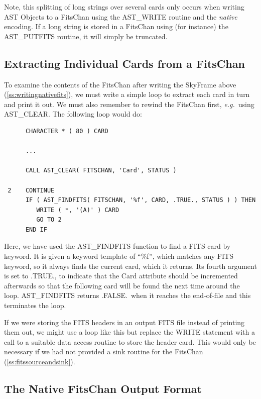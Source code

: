 \documentclass[twoside,11pt]{article}
\newcommand{\htmlref}[2]{#1}
\newcommand{\secref}[1]{\S\ref{#1}}
\renewcommand{\secref}[1]{\ref{#1}}
\begin{document}
Note, this splitting of long strings over several cards only occurs when
writing AST Objects to a FitsChan using the AST\_WRITE routine and the
{\em native} encoding. If a long string is stored in a FitsChan using
(for instance) the \htmlref{AST\_PUTFITS}{AST_PUTFITS} routine, it will simply be truncated.

\subsection{\label{ss:extractingfitscards}Extracting Individual Cards from a FitsChan}

To examine the contents of the \htmlref{FitsChan}{FitsChan} after writing the \htmlref{SkyFrame}{SkyFrame}
above (\secref{ss:writingnativefits}), we must write a simple loop to
extract each card in turn and print it out. We must also remember to
rewind the FitsChan first, {\em{e.g.}}\ using \htmlref{AST\_CLEAR}{AST_CLEAR}. The
following loop would do:

\small
\begin{verbatim}
      CHARACTER * ( 80 ) CARD

      ...

      CALL AST_CLEAR( FITSCHAN, 'Card', STATUS )

 2    CONTINUE
      IF ( AST_FINDFITS( FITSCHAN, '%f', CARD, .TRUE., STATUS ) ) THEN
         WRITE ( *, '(A)' ) CARD
         GO TO 2
      END IF
\end{verbatim}
\normalsize

Here, we have used the \htmlref{AST\_FINDFITS}{AST_FINDFITS} function to find a FITS card by
keyword. It is given a keyword template of ``\%f'', which matches any
FITS keyword, so it always finds the current card, which it
returns. Its fourth argument is set to .TRUE., to indicate that the
\htmlref{Card}{Card} attribute should be incremented afterwards so that the following
card will be found the next time around the loop. AST\_FINDFITS
returns .FALSE.\ when it reaches the end-of-file and this terminates
the loop.

If we were storing the FITS headers in an output FITS file instead of
printing them out, we might use a loop like this but replace the WRITE
statement with a call to a suitable data access routine to store the
header card. This would only be necessary if we had not provided a
sink routine for the FitsChan (\secref{ss:fitssourceandsink}).

\subsection{The Native FitsChan Output Format}
\end{document}
